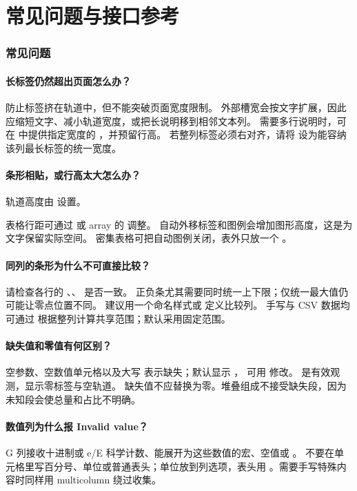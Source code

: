 \part{常见问题与接口参考}


\section{常见问题}
\subsection{长标签仍然超出页面怎么办？}
 防止标签挤在轨道中，但不能突破页面宽度限制。
外部槽宽会按文字扩展，因此应缩短文字、减小轨道宽度，或把长说明移到相邻文本列。
需要多行说明时，可在  中提供指定宽度的 \key{\parbox}，并预留行高。
若整列标签必须右对齐，请将  设为能容纳该列最长标签的统一宽度。

\subsection{条形相贴，或行高太大怎么办？}
轨道高度由  设置。\par
表格行距可通过
\key{\renewcommand{\arraystretch}{1.5}} 或 array 的
\key{\setlength{\extrarowheight}{3pt}} 调整。
自动外移标签和图例会增加图形高度，这是为文字保留实际空间。
密集表格可把自动图例关闭，表外只放一个 \key{\gradbarslegend}。

\subsection{同列的条形为什么不可直接比较？}
请检查各行的 、、 是否一致。
正负条尤其需要同时统一上下限；仅统一最大值仍可能让零点位置不同。
建议用一个命名样式或 \key{\gradbarscolumn} 定义比较列。
手写与 CSV 数据均可通过  根据整列计算共享范围；默认采用固定范围。

\subsection{缺失值和零值有何区别？}
空参数、空数值单元格以及大写  表示缺失；默认显示 \key{--}，
可用  修改。 是有效观测，显示零标签与空轨道。
缺失值不应替换为零。堆叠组成不接受缺失段，因为未知段会使总量和占比不明确。

\subsection{数值列为什么报 Invalid value？}
G 列接收十进制或 e/E 科学计数、能展开为这些数值的宏、空值或 。
不要在单元格里写百分号、单位或普通表头；单位放到列选项，表头用
。需要手写特殊内容时同样用 multicolumn 绕过收集。

